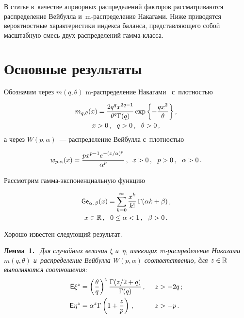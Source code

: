\begin{multicols}{2}
В статье в~качестве априорных распределений факторов рассматриваются 
распределение Вейбулла и~m-рас\-пре\-де\-ле\-ние Накагами. Ниже приводятся вероятностные 
характеристики индекса баланса, представляющего собой масштабную смесь двух 
распределений гам\-ма-класса.

\vspace*{-6pt}

\section{Основные результаты}

\vspace*{-3pt}


Обозначим через $m(q, \theta)$ m-рас\-пре\-де\-ле\-ние Накагами~\cite{Nakagami} 
с~плот\-ностью

\noindent
\begin{multline*}
m_{q, \theta}(x) = \fr{2 q^q x^{2q-1}}{\theta^q \Gamma(q)}
\exp\left\lbrace{-\fr{q x^2}{\theta}}\right\rbrace, \\[-1pt]
 x>0\,,\ \ q>0\,,\ \ 
\theta>0\,,
\end{multline*}
а через $W(p,\alpha)$~--- распределение Вейбулла с~плот\-ностью

\noindent
$$
w_{p,\alpha}(x) = \displaystyle\frac{\displaystyle px^{p-1}e^{-({x/\alpha})^{p}}\mathstrut}{\displaystyle \alpha^{p}\mathstrut}\,,  \enskip 
x>0\,,\ \  p>0\,,\  \ \alpha>0\,.
$$

\vspace*{-2pt}

\noindent
Рассмотрим гамма-экс\-по\-нен\-ци\-аль\-ную функцию~\cite{KuTi2017}

\noindent
\begin{multline*}
{\sf Ge}_{\alpha,\, \beta} (x) = 
\sum\limits_{k=0}^{\infty}\displaystyle\frac{\displaystyle x^k\mathstrut}{\displaystyle k!\mathstrut}\, \Gamma(\alpha k 
+ \beta)\,, \\[-1pt]
 x\in\mathbb{R}\,, \ \ 0\le\alpha<1\,, \ \ \beta> 0\,.
\end{multline*}

Хорошо известен следующий результат.

\vspace*{2pt}

\noindent
\textbf{Лемма~1.}\
\textit{Для случайных величин $\xi$ и~$\eta$, имеющих m-рас\-пре\-де\-ле\-ние 
Накагами $m(q,  \theta)$ и~распределение Вейбулла $W(p,\alpha)$ соответственно, для 
$z\hm\in\mathbb{R}$ выполняются соотношения}:
\begin{alignat*}{2}
\e\xi^z &= \left(\fr{\theta}{q}\right)^z \fr{\Gamma(z/2+q)}{\Gamma(q)}\,, &\enskip  
z &> -2q\,; \\
 \e\eta^z &= \alpha^z \Gamma\left(1+\fr{z}{p}\right)\,, &\enskip   z &> -p\,.
\end{alignat*}



\end{multicols}
